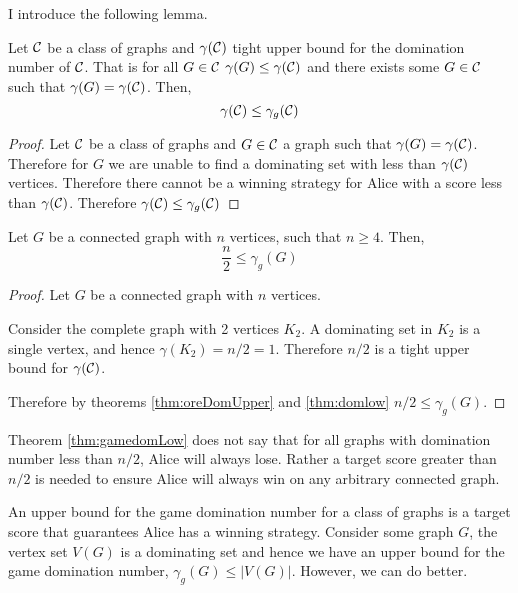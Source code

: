 I introduce the following lemma. 
\begin{lemma}\label{thm:domlow}
    Let $\mathcal{C}$ be a class of graphs and $\gamma(\mathcal{C})$ tight upper bound for the domination number of $\mathcal{C}$. That is for all $G\in\mathcal{C}$ $\gamma(G)\leq\gamma(\mathcal{C})$ and there exists some $G\in\mathcal{C}$ such that $\gamma(G)=\gamma(\mathcal{C})$. Then,
    \[\gamma(\mathcal{C}) \leq  \gamma_g(\mathcal{C})\]
\end{lemma}
\begin{proof}
    Let $\mathcal{C}$ be a class of graphs and $G\in\mathcal{C}$ a graph such that $\gamma(G) = \gamma(\mathcal{C})$. 
    Therefore for $G$ we are unable to find a dominating set with less than $ \gamma(\mathcal{C}) $ vertices.
    Therefore there cannot be a winning strategy for Alice with a score less than $\gamma(\mathcal{C})$.
    Therefore $\gamma(\mathcal{C}) \leq \gamma_g(\mathcal{C})$
\end{proof}

\begin{theorem} \label{thm:gamedomLow}
    Let $G$ be a connected graph with $n$ vertices, such that $n \geq 4$. Then,    
    \[  \frac{n}{2} \leq \gamma_g(G)  \]    
\end{theorem}
\begin{proof}
    Let $G$ be a connected graph with $n$ vertices.
    
    Consider the complete graph with 2 vertices $K_2$. A dominating set in $K_2$ is a single vertex, and hence $\gamma(K_2)=n/2=1$. Therefore $n/2$ is a tight upper bound for $\gamma(\mathcal{C})$. 
    
    Therefore by theorems \ref{thm:oreDomUpper} and \ref{thm:domlow} $ n/2 \leq \gamma_g(G)$.
\end{proof}


Theorem \ref{thm:gamedomLow} does not say that for all graphs with domination number less than $n/2$, Alice will always lose. Rather a target score greater than $n/2$ is needed to ensure Alice will always win on any arbitrary connected graph.


An upper bound for the game domination number for a class of graphs is a target score that guarantees Alice has a winning strategy. Consider some graph $G$, the vertex set $V(G)$ is a dominating set and hence we have an upper bound for the game domination number, $\gamma_g(G) \leq |V(G)|$. However, we can do better.

